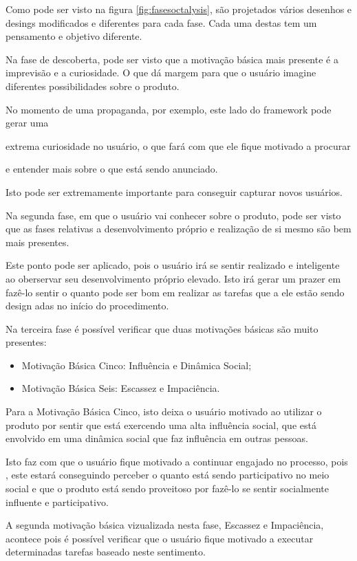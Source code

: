 Como pode ser visto na figura \ref{fig:fasesoctalysis}, são projetados vários
desenhos e desings modificados e diferentes para cada fase. Cada uma destas
tem um pensamento e objetivo diferente.

Na fase de descoberta, pode ser visto que a motivação básica mais presente é
a imprevisão e a curiosidade. O que dá margem para que o usuário imagine diferentes
possibilidades sobre o produto.

No momento de uma propaganda, por exemplo, este lado do framework pode gerar uma

extrema curiosidade no usuário, o que fará com que ele fique motivado a procurar

e entender mais sobre o que está sendo anunciado.

Isto pode ser extremamente importante para conseguir capturar novos usuários.

Na segunda fase, em que o usuário vai conhecer sobre o produto, pode ser visto
que as fases relativas a desenvolvimento próprio e realização de si mesmo
são bem mais presentes.

Este ponto pode ser aplicado, pois o usuário irá se sentir realizado e inteligente
ao oberservar seu desenvolvimento próprio elevado. Isto irá gerar um prazer em fazê-lo
sentir o quanto pode ser bom em realizar as tarefas que a ele estão sendo design
adas
no início do procedimento.

Na terceira fase é possível verificar que duas motivações básicas são muito presentes:

\begin{itemize}
    \item Motivação Básica Cinco: Influência e Dinâmica Social;
    \item Motivação Básica Seis: Escassez e Impaciência.
\end{itemize}


Para a Motivação Básica Cinco, isto deixa o usuário motivado ao utilizar o produto
por sentir que está exercendo uma alta influência social, que está envolvido em
uma dinâmica social que faz influência em outras pessoas.

Isto faz com que o usuário fique motivado a continuar engajado no processo, pois
,
este estará conseguindo perceber o quanto está sendo participativo no meio social
e que o produto está sendo proveitoso por fazê-lo se sentir socialmente influente
e participativo.


A segunda motivação básica vizualizada nesta fase, Escassez e Impaciência, acontece
pois é possível verificar que o usuário fique motivado a executar determinadas
tarefas baseado neste sentimento.

